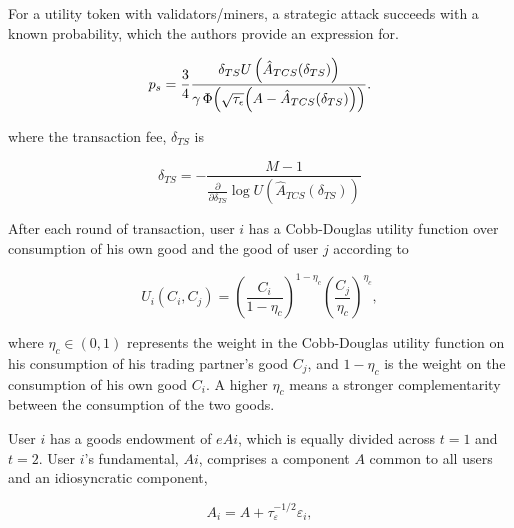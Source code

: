         For a utility token with validators/miners, a strategic attack succeeds with a known probability, which the authors provide an expression for.

        \begin{equation} 
        
        p_{s}=\frac{3}{4}\frac{\delta_{T S}U\left(\hat{A}_{T C S}(\delta_{T S})\right)}{\gamma\,\Phi\Bigl(\sqrt{\tau_{\epsilon}}\Bigl(A-\hat{A}_{T C S}(\delta_{T S})\Bigr)\Bigr)}. 
        
        \end{equation}

        where the transaction fee, $\delta_{T S}$ is

        \begin{equation} 
        
        \delta_{T S}=-\frac{M-1}{\frac{\partial}{\partial\delta_{T S}}\log U\left(\hat{A}_{T C S}(\delta_{T S})\right)} 
        
        \end{equation}

        After each round of transaction, user $i$ has a Cobb-Douglas utility function over consumption of his own good and the good of user $j$ according to

        \begin{equation} 
        
        U_{i}(C_{i},C_{j})=\left(\frac{C_{i}}{1-\eta_{c}}\right)^{1-\eta_{c}}\left(\frac{C_{j}}{\eta_{c}}\right)^{\eta_{c}}, 
        
        \end{equation}

        where $\eta_{c} \in (0, 1)$ represents the weight in the Cobb-Douglas utility function on his consumption of his trading partner's good $C_j$, and $1 -\eta_{c}$ is the weight on the consumption of his own good $C_i$. A higher $\eta_{c}$ means a stronger complementarity between the consumption of the two goods.

        User $i$ has a goods endowment of $eAi$, which is equally divided across $t = 1$ and $t = 2$. User $i$'s fundamental, $Ai $, comprises a component $A$ common to all users and an idiosyncratic component,

        \begin{equation} 
        
        A_{i}=A+\tau_{\varepsilon}^{-1/2}\varepsilon_{i}, 
        
        \end{equation}

